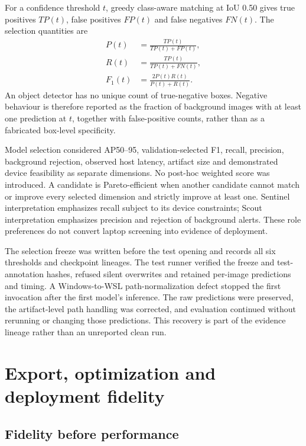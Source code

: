 For a confidence threshold $t$, greedy class-aware matching at IoU 0.50 gives
true positives $TP(t)$, false positives $FP(t)$ and false negatives $FN(t)$.
The selection quantities are
\begin{align}
  P(t) &= \frac{TP(t)}{TP(t)+FP(t)}, \\
  R(t) &= \frac{TP(t)}{TP(t)+FN(t)}, \\
  F_1(t) &= \frac{2P(t)R(t)}{P(t)+R(t)}.
  \label{eq:threshold-f1}
\end{align}
An object detector has no unique count of true-negative boxes. Negative
behaviour is therefore reported as the fraction of background images with at
least one prediction at $t$, together with false-positive counts, rather than
as a fabricated box-level specificity.

Model selection considered AP50--95, validation-selected F1, recall,
precision, background rejection, observed host latency, artifact size and
demonstrated device feasibility as separate dimensions. No post-hoc weighted
score was introduced. A candidate is Pareto-efficient when another candidate
cannot match or improve every selected dimension and strictly improve at least
one. Sentinel interpretation emphasizes recall subject to its device
constraints; Scout interpretation emphasizes precision and rejection of
background alerts. These role preferences do not convert laptop screening
into evidence of deployment.

The selection freeze was written before the test opening and records all six
thresholds and checkpoint lineages. The test runner verified the freeze and
test-annotation hashes, refused silent overwrites and retained per-image
predictions and timing. A Windows-to-WSL path-normalization defect stopped the
first invocation after the first model's inference. The raw predictions were
preserved, the artifact-level path handling was corrected, and evaluation
continued without rerunning or changing those predictions. This recovery is
part of the evidence lineage rather than an unreported clean run.

\section{Export, optimization and deployment fidelity}
\label{sec:data-models:6}

\subsection{Fidelity before performance}

